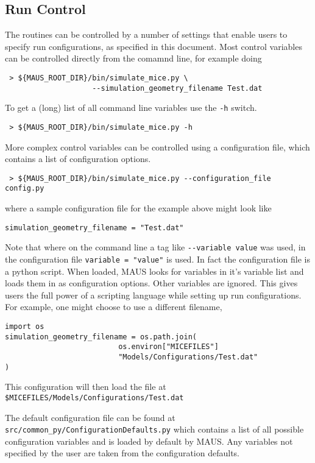\subsection{Run Control}
The routines can be controlled by a number of settings that enable users to specify run configurations, as specified in this document. Most control variables can be controlled directly from the comamnd line, for example doing
\begin{verbatim}
 > ${MAUS_ROOT_DIR}/bin/simulate_mice.py \
                    --simulation_geometry_filename Test.dat
\end{verbatim}
To get a (long) list of all command line variables use the \verb|-h| switch.
\begin{verbatim}
 > ${MAUS_ROOT_DIR}/bin/simulate_mice.py -h
\end{verbatim}

More complex control variables can be controlled using a configuration file, which contains a list of configuration options.
\begin{verbatim}
 > ${MAUS_ROOT_DIR}/bin/simulate_mice.py --configuration_file config.py
\end{verbatim}
where a sample configuration file for the example above might look like
\begin{verbatim}
simulation_geometry_filename = "Test.dat"
\end{verbatim}
Note that where on the command line a tag like \verb|--variable value| was used, in the configuration file \verb|variable = "value"| is used. In fact the configuration file is a python script. When loaded, MAUS looks for variables in it's variable list and loads them in as configuration options. Other variables are ignored. This gives users the full power of a scripting language while setting up run configurations. For example, one might choose to use a different filename,
\begin{verbatim}
import os
simulation_geometry_filename = os.path.join(
                          os.environ["MICEFILES"]
                          "Models/Configurations/Test.dat"
)
\end{verbatim}
This configuration will then load the file at \verb|$MICEFILES/Models/Configurations/Test.dat|

The default configuration file can be found at \verb|src/common_py/ConfigurationDefaults.py| which contains a list of all possible configuration variables and is loaded by default by MAUS. Any variables not specified by the user are taken from the configuration defaults.

